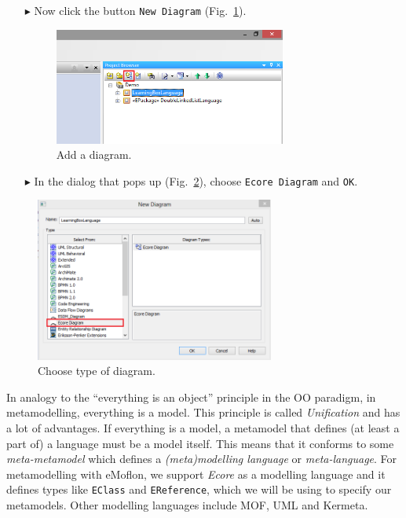 \begin{enumerate}
\item[$\blacktriangleright$] Now click the button \texttt{New Diagram} (Fig.~\ref{fig:diagram}).

\begin{figure}[htbp]
	\centering
  \includegraphics[width=0.72\textwidth]{pics/memBoxBilder/memBox04.png}
	\caption{Add a diagram.}
	\label{fig:diagram}
\end{figure}
\FloatBarrier
\clearpage

\item[$\blacktriangleright$] In the dialog that pops up (Fig.~\ref{fig:diagram_type}), choose \texttt{Ecore Diagram} and  \texttt{OK}.
\end{enumerate}

\begin{figure}[htbp]
	\centering
  \includegraphics[width=0.7\textwidth]{pics/memBoxBilder/memBox05.png}
	\caption{Choose type of diagram.}
	\label{fig:diagram_type}
\end{figure}
\FloatBarrier

In analogy to the ``everything is an object'' principle in the OO paradigm, in metamodelling, everything is a model.
This principle is called \emph{Unification} and has a lot of advantages.
If everything is a model, a metamodel that defines (at least a part of) a language must be a model itself.
This means that it conforms to some \emph{meta-metamodel} which defines a \emph{(meta)modelling language} or \emph{meta-language}.
For metamodelling with eMoflon, we support \emph{Ecore} as a modelling language and it defines types like \texttt{EClass} and \texttt{EReference}, which we will be using to specify  our metamodels.
Other modelling languages include MOF, UML and Kermeta.


